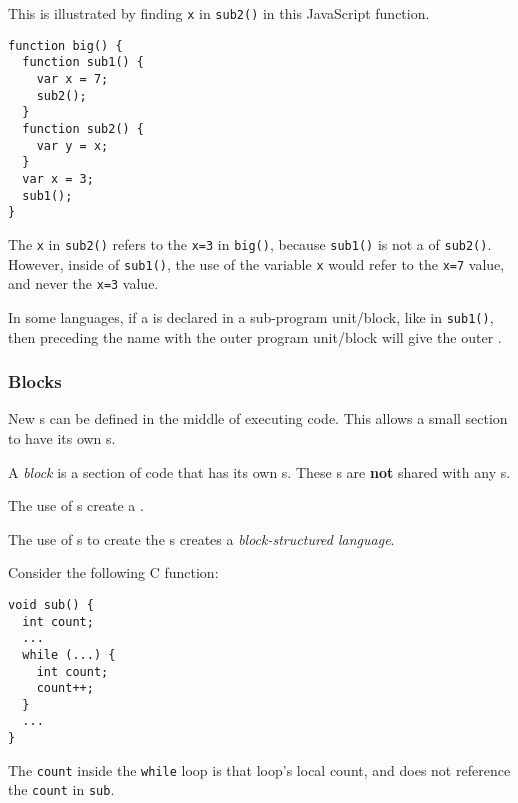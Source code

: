 This is illustrated by finding \texttt{x} in \texttt{sub2()} in this JavaScript function.
\begin{verbatim}
function big() {
  function sub1() {
    var x = 7;
    sub2();
  }
  function sub2() {
    var y = x;
  }
  var x = 3;
  sub1();
}
\end{verbatim}
The \texttt{x} in \texttt{sub2()} refers to the \texttt{x=3} in \texttt{big()}, because \texttt{sub1()} is not a  of \texttt{sub2()}.
However, inside of \texttt{sub1()}, the use of the variable \texttt{x} would refer to the \texttt{x=7} value, and never the \texttt{x=3} value.

In some languages, if a  is declared in a sub-program unit/block, like in \texttt{sub1()}, then preceding the  name with the outer program unit/block will give the outer  .

\subsubsection{Blocks}\label{subsubsec:Variable_Blocks}
New s can be defined in the middle of executing code.
This allows a small section to have its own s.

\begin{definition}[Block]\label{def:Block_Scope}
  A \emph{block} is a section of code that has its own s.
  These s are \textbf{not} shared with any s.
\end{definition}

The use of s create a .

\begin{definition}\label{def:Block_Structured_Language}
  The use of s to create the s creates a \emph{block-structured language}.
\end{definition}

Consider the following C function:
\begin{verbatim}
void sub() {
  int count;
  ...
  while (...) {
    int count;
    count++;
  }
  ...
}
\end{verbatim}
The \texttt{count} inside the \texttt{while} loop is that loop's local count, and does not reference the \texttt{count} in \texttt{sub}.

